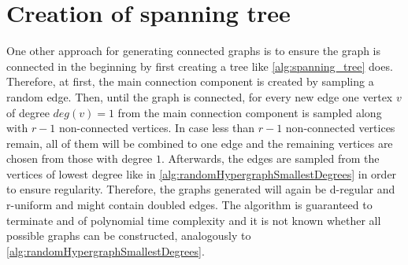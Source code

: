 \section{Creation of spanning tree}
One other approach for generating connected graphs is to ensure the graph is connected in the beginning by first creating a tree like  \cref{alg:spanning_tree} does. Therefore, at first, the main connection component is created by sampling a random edge. Then, until the graph is connected, for every new edge one vertex $v$ of degree $deg(v) = 1$ from the main connection component is sampled along with $r-1$ non-connected vertices. In case less than $r-1$ non-connected vertices remain, all of them will be combined to one edge and the remaining vertices are chosen from those with degree $1$.
Afterwards, the edges are sampled from the vertices of lowest degree like in \cref{alg:randomHypergraphSmallestDegrees} in order to ensure regularity.
Therefore, the graphs generated will again be d-regular and r-uniform and might contain doubled edges. The algorithm is guaranteed to terminate and of polynomial time complexity and it is not known whether all possible graphs can be constructed, analogously to \cref{alg:randomHypergraphSmallestDegrees}.


